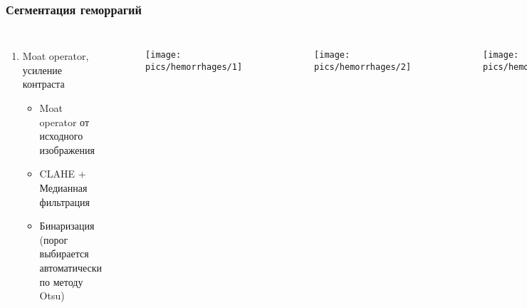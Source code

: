 \documentclass{beamer}
\begin{document}
\begin{frame}
	\frametitle{Сегментация геморрагий}
	\vspace*{-0.55cm}
	\begin{columns}[c]
		
		\begin{enumerate}
			\footnotesize
			\setcounter{enumi}{0}
			\item Moat operator, усиление контраста
			\begin{itemize}
				\item Moat operator от исходного изображения
				\vspace{1.5cm}
				\item CLAHE + Медианная фильтрация
				\vspace{1.5cm}
				\item Бинаризация (порог выбирается автоматически по методу Otsu)
				\normalsize
			\end{itemize}
		\end{enumerate}
			\begin{figure}
			\centering
			\texttt{[image: pics/hemorrhages/1]}
			\label{fig:1}
			\end{figure}
			\vspace*{-1.75cm}
			\begin{figure}
			\centering
			\texttt{[image: pics/hemorrhages/2]}
			\label{fig:2}
			\end{figure}
			\vspace*{-1.75cm}
			\begin{figure}
			\centering
			\texttt{[image: pics/hemorrhages/3]}
			\label{fig:3}
			\end{figure}
		
	\end{columns}
\end{frame}

\end{document}
